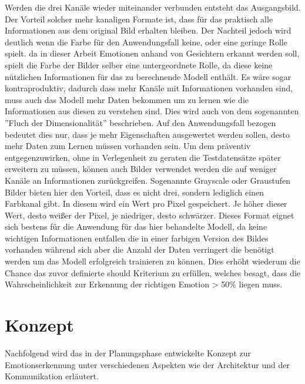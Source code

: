 \documentclass[12pt, a4paper]{scrbook}
\begin{document}
Werden die drei Kanäle wieder miteinander verbunden entsteht das Ausgangsbild. Der Vorteil solcher mehr kanaligen Formate ist, dass für das praktisch alle Informationen aus dem original Bild erhalten bleiben. Der Nachteil jedoch wird deutlich wenn die Farbe für den Anwendungsfall keine, oder eine geringe Rolle spielt. da in dieser Arbeit Emotionen anhand von Gesichtern erkannt werden soll, spielt die Farbe der Bilder selber eine untergeordnete Rolle, da diese keine nützlichen Informationen für das zu berechnende Modell enthält. Es wäre sogar kontraproduktiv, dadurch dass mehr Kanäle mit Informationen vorhanden sind, muss auch das Modell mehr Daten bekommen um zu lernen wie die Informationen aus diesen zu verstehen sind. Dies wird auch von dem sogenannten ''Fluch der Dimensionalität'' beschrieben. Auf den Anwendungsfall bezogen bedeutet dies nur, dass je mehr Eigenschaften ausgewertet werden sollen, desto mehr Daten zum Lernen müssen vorhanden sein. Um dem präventiv entgegenzuwirken, ohne in Verlegenheit zu geraten die Testdatensätze später erweitern zu müssen, können auch Bilder verwendet werden die auf weniger Kanäle an Informationen zurückgreifen. Sogenannte Grayscale oder Graustufen Bilder bieten hier den Vorteil, dass es nicht drei, sondern lediglich einen Farbkanal gibt. In diesem wird ein Wert pro Pixel gespeichert. Je höher dieser Wert, desto weißer der Pixel, je niedriger, desto schwärzer. Dieses Format eignet sich bestens für die Anwendung für das hier behandelte Modell, da keine wichtigen Informationen entfallen die in einer farbigen Version des Bildes vorhanden während sich aber die Anzahl der Daten verringert die benötigt werden um das Modell erfolgreich trainieren zu können. Dies erhöht wiederum die Chance das zuvor definierte should Kriterium zu erfüllen, welches besagt, dass die Wahrscheinlichkeit zur Erkennung der richtigen Emotion > 50\% liegen muss. 
\let\cleardoublepage\relax

\chapter{Konzept}
Nachfolgend wird das in der Planungsphase entwickelte Konzept zur Emotionserkennung unter verschiedenen Aspekten wie der Architektur und der Kommunikation erläutert.
\end{document}
